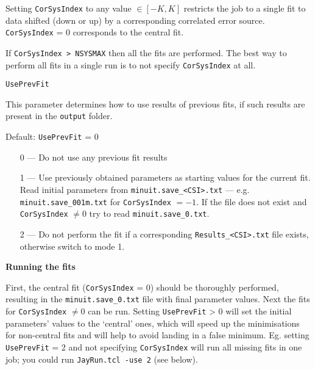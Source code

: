 Setting \verb'CorSysIndex' to any value $\in [-K, K]$ 
restricts the job to a single fit to data shifted (down or up) by a corresponding
correlated error source.
\verb'CorSysIndex' = 0 corresponds to the central fit.

If \verb'CorSysIndex > NSYSMAX' then all the fits are performed.
The best way to perform all fits in a single run is 
to not specify \verb'CorSysIndex' at all.
\vspace{0.4cm}

{\tt UsePrevFit}

This parameter determines how to use results of previous fits,
if such results are present in the \verb'output' folder.

Default: \verb'UsePrevFit' = 0

\begin{enumerate}
\item [0 ---]
Do not use any previous fit results
\item [1 ---]
Use previously obtained parameters as starting values for the current fit.
Read initial parameters from \verb'minuit.save_<CSI>.txt'
 --- e.g.  \verb'minuit.save_001m.txt' for \verb'CorSysIndex' $= -1$.
If the file does not exist and \verb'CorSysIndex' $\neq 0$ try to read
\verb'minuit.save_0.txt'.
\item [2 ---]
Do not perform the fit if a corresponding \verb'Results_<CSI>.txt' file exists,
otherwise switch to mode 1.
\end{enumerate}
\vspace{0.4cm}

{\bf {Running the fits}}

First, the central fit (\verb'CorSysIndex' = 0) should be thoroughly performed,
resulting in the \verb'minuit.save_0.txt' file with final parameter values.
Next the fits for \verb'CorSysIndex' $\neq 0$
can be run. Setting \verb'UsePrevFit' > 0 will set the initial parameters' values to the `central' ones,
which will speed up the minimisations for non-central fits
and will help to avoid landing in a false minimum.
Eg. setting \verb'UsePrevFit' = 2 and not specifying \verb'CorSysIndex' 
will run all missing fits in one job;
you could run \verb'JayRun.tcl -use 2' (see below).


